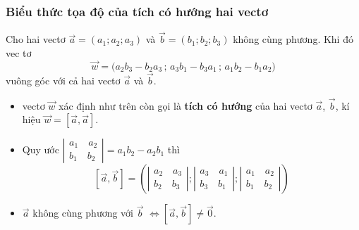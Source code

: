 \subsubsection{Biểu thức tọa độ của tích có hướng hai vectơ}
Cho hai vectơ $\vec{a}=(a_1;a_2;a_3)$ và $\vec{b}=(b_1;b_2;b_3)$ không cùng phương. Khi đó vec tơ $$\vec{w}=\bigg(a_2b_3-b_2a_3\,;\,a_3b_1-b_3a_1\,;\,a_1b_2-b_1a_2 \bigg)$$ vuông góc với cả hai vectơ $\vec{a}$ và $\vec{b}$.
\begin{note}
	\begin{itemize}
		\item [\ding{172}] vectơ $\vec{w}$ xác định như trên còn gọi là \textbf{tích có hướng} của hai vectơ $\vec{a}$, $\vec{b}$, kí hiệu  $\vec{w}=\left[\vec{a},\vec{a}\right]$.
		\item [\ding{173}] Quy ước $\left|\begin{array}{l}
				      {a_1}\quad{a_2} \\
				      {b_1}\quad{b_2}
			      \end{array}\right|=a_1b_2-a_2b_1$ thì
		      $$\left[\vec a ,\vec b\right]=\left(\left|\begin{array}{l}
					      {a_2}\quad{a_3} \\
					      {b_2}\quad{b_3}
				      \end{array}\right|;\left|\begin{array}{l}
					      {a_3}\quad {a_1} \\
					      {b_3}\quad{b_1}
				      \end{array}\right|;\left|\begin{array}{l}
					      {a_1}\quad{a_2} \\
					      {b_1}\quad{b_2}
				      \end{array}\right|\right)$$
		\item [\ding{174}] $\vec{a}$ không cùng phương với $\vec{b}$ $\Leftrightarrow \left[\vec a ,\vec b\right] \ne \vec{0}$.
	\end{itemize}
\end{note}
